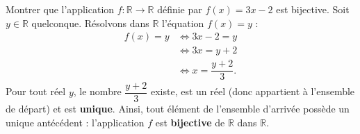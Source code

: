 \documentclass[11pt]{article}
\begin{document}
\begin{exoresolu}[Bijectivité de $f(x) = 3x - 2$]
Montrer que l'application $f : \mathbb{R} \to \mathbb{R}$ définie par $f(x) = 3x - 2$ est bijective.
\tcblower
Soit $y \in \mathbb{R}$ quelconque. Résolvons dans $\mathbb{R}$ l'équation $f(x) = y$ :
\begin{align*}
f(x) = y &\iff 3x - 2 = y \\
&\iff 3x = y + 2 \\
&\iff x = \dfrac{y + 2}{3}.
\end{align*}
Pour tout réel $y$, le nombre $\dfrac{y+2}{3}$ existe, est un réel (donc appartient à l'ensemble de départ) et est \textbf{unique}. Ainsi, tout élément de l'ensemble d'arrivée possède un unique antécédent : l'application $f$ est \textbf{bijective} de $\mathbb{R}$ dans $\mathbb{R}$.
\end{exoresolu}
\end{document}
